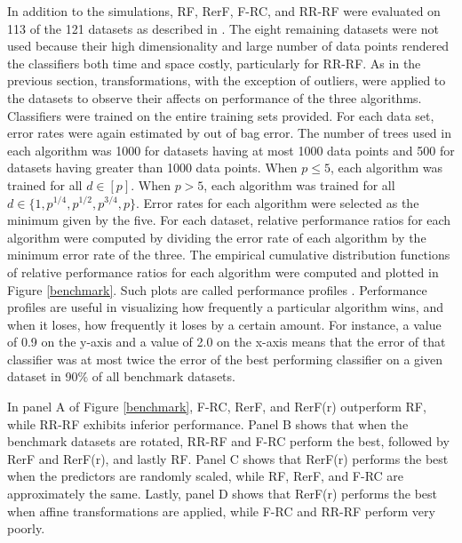\documentclass{article}
\begin{document}
In addition to the simulations, RF, RerF, F-RC, and RR-RF were evaluated on 113 of the 121 datasets as described in \cite{Delgado2014}. The eight remaining datasets were not used because their high dimensionality and large number of data points rendered the classifiers both time and space costly, particularly for RR-RF. As in the previous section, transformations, with the exception of outliers, were applied to the datasets to observe their affects on performance of the three algorithms. Classifiers were trained on the entire training sets provided. For each data set, error rates were again estimated by out of bag error. The number of trees used in each algorithm was 1000 for datasets having at most 1000 data points and 500 for datasets having greater than 1000 data points. When $p \leq 5$, each algorithm was trained for all $d \in [p]$. When $p > 5$, each algorithm was trained for all $d \in \{1,p^{1/4},p^{1/2},p^{3/4},p\}$. Error rates for each algorithm were selected as the minimum given by the five. For each dataset, relative performance ratios for each algorithm were computed by dividing the error rate of each algorithm by the minimum error rate of the three. The empirical cumulative distribution functions of relative performance ratios for each algorithm were computed and plotted in Figure \ref{benchmark}. Such plots are called performance profiles \cite{Dolan2002}. Performance profiles are useful in visualizing how frequently a particular algorithm wins, and when it loses, how frequently it loses by a certain amount. For instance, a value of 0.9 on the y-axis and a value of 2.0 on the x-axis means that the error of that classifier was at most twice the error of the best performing classifier on a given dataset in 90$\%$ of all benchmark datasets. 

In panel A of Figure \ref{benchmark}, F-RC, RerF, and RerF(r) outperform RF, while RR-RF exhibits inferior performance. Panel B shows that when the benchmark datasets are rotated, RR-RF and F-RC perform the best, followed by RerF and RerF(r), and lastly RF. Panel C shows that RerF(r) performs the best when the predictors are randomly scaled, while RF, RerF, and F-RC are approximately the same. Lastly, panel D shows that RerF(r) performs the best when affine transformations are applied, while F-RC and RR-RF perform very poorly. 
\end{document}
